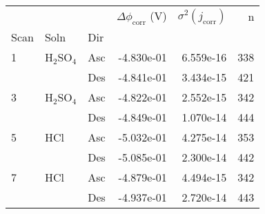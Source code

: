 \begin{tabular}{lllrrr}
\toprule
  &     &     &  $\Delta \phi_{\text{corr}}$ (V) &  $\sigma^2(j_{\text{corr}})$ &    n \\
Scan & Soln & Dir &                                  &                              &      \\
\midrule
1 & H$_2$SO$_4$ & Asc &                       -4.830e-01 &                    6.559e-16 &  338 \\
  &     & Des &                       -4.841e-01 &                    3.434e-15 &  421 \\
3 & H$_2$SO$_4$ & Asc &                       -4.822e-01 &                    2.552e-15 &  342 \\
  &     & Des &                       -4.849e-01 &                    1.070e-14 &  444 \\
5 & HCl & Asc &                       -5.032e-01 &                    4.275e-14 &  353 \\
  &     & Des &                       -5.085e-01 &                    2.300e-14 &  442 \\
7 & HCl & Asc &                       -4.879e-01 &                    4.494e-15 &  342 \\
  &     & Des &                       -4.937e-01 &                    2.720e-14 &  443 \\
\bottomrule
\end{tabular}
